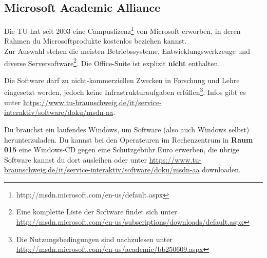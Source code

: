\subsection{Microsoft Academic Alliance}
	\label{msdnaa}
	Die TU hat seit 2003 eine Campuslizenz\footnote{http://msdn.microsoft.com/en-us/default.aspx} von Microsoft erworben, in deren Rahmen du Microsoftprodukte kostenlos beziehen kannst.\\ 
	Zur Auswahl stehen die meisten Betriebssysteme, Entwicklungswerkzeuge und diverse Serversoftware\footnote{\sloppy Eine komplette Liste der Software findet sich unter \url{http://msdn.microsoft.com/en-us/subscriptions/downloads/default.aspx}}. Die Office-Suite ist explizit \textbf{nicht} enthalten.

	Die Software darf zu nicht-kommerziellen Zwecken in Forschung und Lehre eingesetzt werden, jedoch keine Infrastrukturaufgaben erfüllen\footnote{Die Nutzungsbedingungen sind nachzulesen unter \url{http://msdn.microsoft.com/en-us/academic/bb250609.aspx}}. Infos gibt es unter \url{https://www.tu-braunschweig.de/it/service-interaktiv/software/doku/msdn-aa}.

	Du brauchst ein laufendes Windows, um Software (also auch
	Windows selbst) herunterzuladen. Du kannst  bei den Operateuren
	im Rechenzentrum in \textbf{Raum 015} eine Windows-CD gegen eine Schutzgebühr Euro erwerben, die übrige Software kannst du dort ausleihen oder unter \url{https://www.tu-braunschweig.de/it/service-interaktiv/software/doku/msdn-aa} downloaden.
